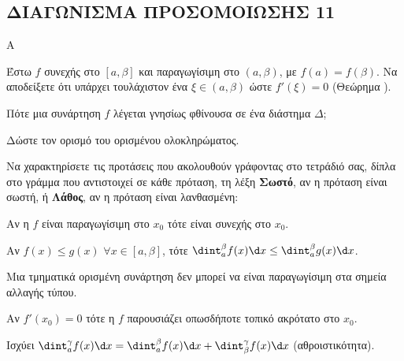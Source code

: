 \newpage
\subsection{ΔΙΑΓΩΝΙΣΜΑ ΠΡΟΣΟΜΟΙΩΣΗΣ 11}
\begin{thema}{Α}
\begin{erwthma}
    \item Έστω $f$ συνεχής στο $[a, \beta]$ και παραγωγίσιμη στο $(a, \beta)$, με $f(a)=f(\beta)$. Να αποδείξετε ότι υπάρχει τουλάχιστον ένα $\xi \in (a, \beta)$ ώστε $f'(\xi)=0$ (Θεώρημα ). 
    \item Πότε μια συνάρτηση $f$ λέγεται γνησίως φθίνουσα σε ένα διάστημα $\Delta$; 
    \item Δώστε τον ορισμό του ορισμένου ολοκληρώματος. 
    \item Να χαρακτηρίσετε τις προτάσεις που ακολουθούν γράφοντας στο τετράδιό σας, δίπλα στο γράμμα που αντιστοιχεί σε κάθε πρόταση, τη λέξη \textbf{Σωστό},
αν η πρόταση είναι σωστή, ή \textbf{Λάθος}, αν η πρόταση είναι λανθασμένη:
    \begin{alist}
        \item Αν η $f$ είναι παραγωγίσιμη στο $x_0$ τότε είναι συνεχής στο $x_0$.
        \item Αν $f(x) \leq g(x)$ $\forall x\in[a,\beta]$, τότε $\dint_a^\beta f(x)\d x \leq \dint_a^\beta g(x)\d x$.
        \item Μια τμηματικά ορισμένη συνάρτηση δεν μπορεί να είναι παραγωγίσιμη στα σημεία αλλαγής τύπου.
        \item Αν $f'(x_0)=0$ τότε η $f$ παρουσιάζει οπωσδήποτε τοπικό ακρότατο στο $x_0$.
        \item Ισχύει $\dint_a^\gamma f(x)\d x = \dint_a^\beta f(x)\d x + \dint_\beta^\gamma f(x)\d x$ (αθροιστικότητα).
    \end{alist} 
\end{erwthma}
\end{thema}

